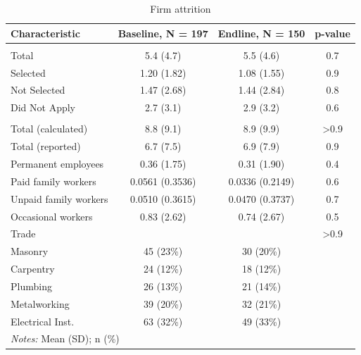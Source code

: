 \documentclass[
  a4paper, twoside, 12pt]{book}
\begin{document}
\begin{singlespacing}
\begin{table}[H]
\caption{\label{tab:tbl-attritionfirms}Firm attrition}
\centering
\fontsize{10}{12}\selectfont
\begin{tabular}[t]{lccc}
\toprule
\textbf{Characteristic} & \textbf{Baseline}, N = 197 & \textbf{Endline}, N = 150 & \textbf{p-value}\\
\midrule
\addlinespace[0.3em]
\multicolumn{4}{l}{Apprentices trained}\\
\hspace{1em}Total & 5.4 (4.7) & 5.5 (4.6) & 0.7\\
\hspace{1em}Selected & 1.20 (1.82) & 1.08 (1.55) & 0.9\\
\hspace{1em}Not Selected & 1.47 (2.68) & 1.44 (2.84) & 0.8\\
\hspace{1em}Did Not Apply & 2.7 (3.1) & 2.9 (3.2) & 0.6\\
\addlinespace[0.3em]
\multicolumn{4}{l}{Firm size}\\
\hspace{1em}Total (calculated) & 8.8 (9.1) & 8.9 (9.9) & >0.9\\
\hspace{1em}Total (reported) & 6.7 (7.5) & 6.9 (7.9) & 0.9\\
\hspace{1em}Permanent employees & 0.36 (1.75) & 0.31 (1.90) & 0.4\\
\hspace{1em}Paid family workers & 0.0561 (0.3536) & 0.0336 (0.2149) & 0.6\\
\hspace{1em}Unpaid family workers & 0.0510 (0.3615) & 0.0470 (0.3737) & 0.7\\
\hspace{1em}Occasional workers & 0.83 (2.62) & 0.74 (2.67) & 0.5\\
Trade &  &  & >0.9\\
\hspace{1em}Masonry & 45 (23\%) & 30 (20\%) & \\
\hspace{1em}Carpentry & 24 (12\%) & 18 (12\%) & \\
\hspace{1em}Plumbing & 26 (13\%) & 21 (14\%) & \\
\hspace{1em}Metalworking & 39 (20\%) & 32 (21\%) & \\
\hspace{1em}Electrical Inst. & 63 (32\%) & 49 (33\%) & \\
\bottomrule
\multicolumn{4}{l}{\rule{0pt}{1em}\textit{Notes:} Mean (SD); n (\%)}\\
\end{tabular}
\end{table}




\end{singlespacing}
\end{document}
